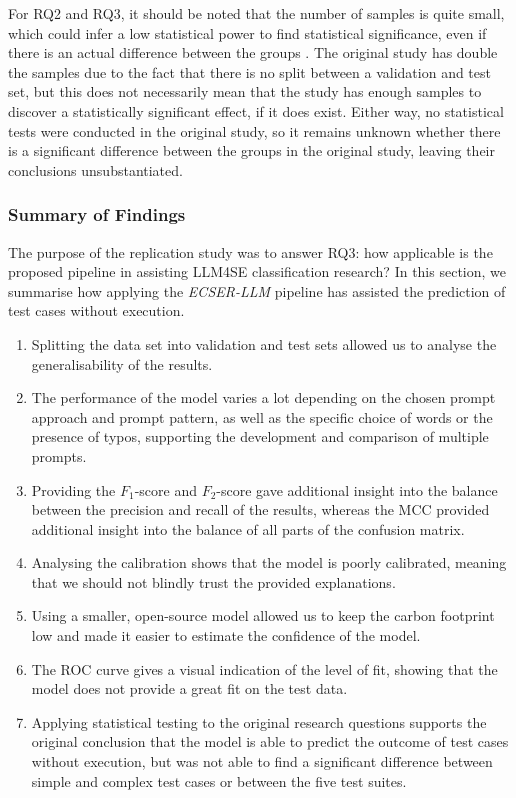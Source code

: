 \documentclass[a4paper]{article}
\newcommand{\newecser}{\textit{ECSER-LLM} }
\begin{document}
For RQ2 and RQ3, it should be noted that the number of samples is quite small, which could infer a low statistical power to find statistical significance, even if there is an actual difference between the groups \cite{Cohen1992}. The original study has double the samples due to the fact that there is no split between a validation and test set, but this does not necessarily mean that the study has enough samples to discover a statistically significant effect, if it does exist. Either way, no statistical tests were conducted in the original study, so it remains unknown whether there is a significant difference between the groups in the original study, leaving their conclusions unsubstantiated.

\subsubsection{Summary of Findings}
The purpose of the replication study was to answer RQ3: how applicable is the proposed pipeline in assisting LLM4SE classification research? In this section, we summarise how applying the \newecser pipeline has assisted the prediction of test cases without execution.
\begin{enumerate}
	\item Splitting the data set into validation and test sets allowed us to analyse the generalisability of the results.
	\item The performance of the model varies a lot depending on the chosen prompt approach and prompt pattern, as well as the specific choice of words or the presence of typos, supporting the development and comparison of multiple prompts.
	\item Providing the $F_1$-score and $F_2$-score gave additional insight into the balance between the precision and recall of the results, whereas the MCC provided additional insight into the balance of all parts of the confusion matrix.
	\item Analysing the calibration shows that the model is poorly calibrated, meaning that we should not blindly trust the provided explanations.
	\item Using a smaller, open-source model allowed us to keep the carbon footprint low and made it easier to estimate the confidence of the model.
	\item The ROC curve gives a visual indication of the level of fit, showing that the model does not provide a great fit on the test data.
	\item Applying statistical testing to the original research questions supports the original conclusion that the model is able to predict the outcome of test cases without execution, but was not able to find a significant difference between simple and complex test cases or between the five test suites. 
\end{enumerate}
\end{document}
